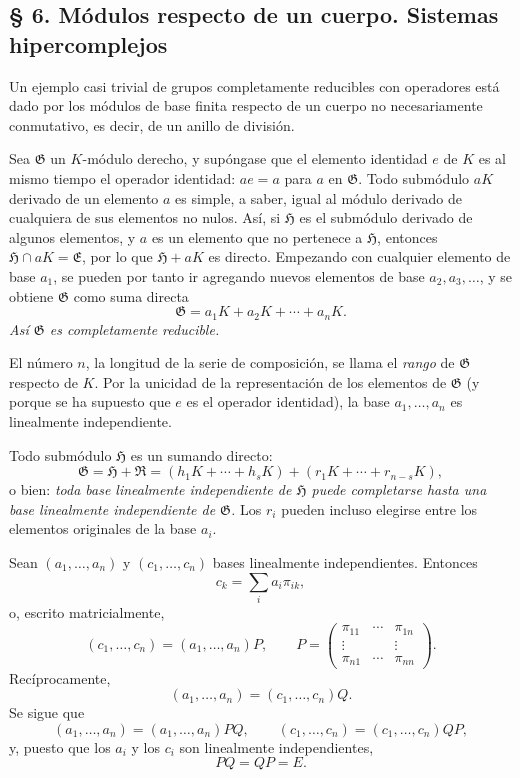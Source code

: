\documentclass[11pt]{article}
\providecommand{\mG}{\mathfrak{G}}
\providecommand{\mE}{\mathfrak{E}}
\providecommand{\mH}{\mathfrak{H}}
\providecommand{\mR}{\mathfrak{R}}
\begin{document}
\subsection*{§ 6. Módulos respecto de un cuerpo. Sistemas hipercomplejos}

Un ejemplo casi trivial de grupos completamente reducibles con operadores está dado por los módulos de base finita respecto de un cuerpo no necesariamente conmutativo, es decir, de un anillo de división.

Sea $\mG$ un $K$-módulo derecho, y supóngase que el elemento identidad $e$ de $K$ es al mismo tiempo el operador identidad: $ae=a$ para $a$ en $\mG$. Todo submódulo $aK$ derivado de un elemento $a$ es simple, a saber, igual al módulo derivado de cualquiera de sus elementos no nulos. Así, si $\mH$ es el submódulo derivado de algunos elementos, y $a$ es un elemento que no pertenece a $\mH$, entonces $\mH\cap aK=\mE$, por lo que $\mH+aK$ es directo. Empezando con cualquier elemento de base $a_1$, se pueden por tanto ir agregando nuevos elementos de base $a_2,a_3,\ldots$, y se obtiene $\mG$ como suma directa
\[
        \mG=a_1K+a_2K+\cdots+a_nK.
\]
\emph{Así $\mG$ es completamente reducible.}

El número $n$, la longitud de la serie de composición, se llama el \emph{rango} de $\mG$ respecto de $K$. Por la unicidad de la representación de los elementos de $\mG$ (y porque se ha supuesto que $e$ es el operador identidad), la base $a_1,\ldots,a_n$ es linealmente independiente.

Todo submódulo $\mH$ es un sumando directo:
\[
        \mG=\mH+\mR=(h_1K+\cdots+h_sK)+(r_1K+\cdots+r_{n-s}K),
\]
o bien: \emph{toda base linealmente independiente de $\mH$ puede completarse hasta una base linealmente independiente de $\mG$.} Los $r_i$ pueden incluso elegirse entre los elementos originales de la base $a_i$.

Sean $(a_1,\ldots,a_n)$ y $(c_1,\ldots,c_n)$ bases linealmente independientes. Entonces
\[
        c_k=\sum_i a_i\pi_{ik},
\]
o, escrito matricialmente,
\[
        (c_1,\ldots,c_n)=(a_1,\ldots,a_n)P,
        \qquad
        P=\begin{pmatrix}
        \pi_{11}&\cdots&\pi_{1n}\\
        \vdots&&\vdots\\
        \pi_{n1}&\cdots&\pi_{nn}
        \end{pmatrix}.
\]
Recíprocamente,
\[
        (a_1,\ldots,a_n)=(c_1,\ldots,c_n)Q.
\]
Se sigue que
\[
        (a_1,\ldots,a_n)=(a_1,\ldots,a_n)PQ,
        \qquad
        (c_1,\ldots,c_n)=(c_1,\ldots,c_n)QP,
\]
y, puesto que los $a_i$ y los $c_i$ son linealmente independientes,
\[
        PQ=QP=E.
\]
\end{document}

